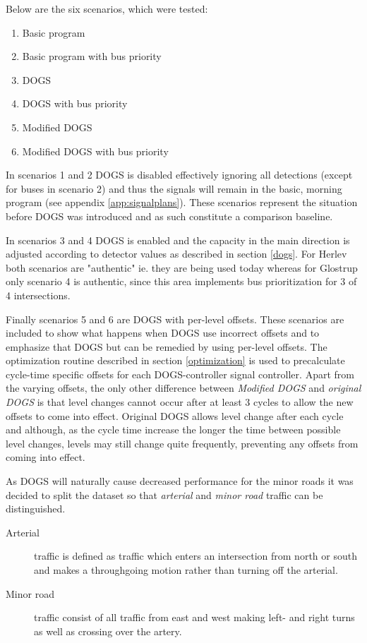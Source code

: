 Below are the six scenarios, which were tested:

\begin{enumerate}
\item Basic program
\item Basic program with bus priority
\item DOGS
\item DOGS with bus priority
\item Modified DOGS
\item Modified DOGS with bus priority
\end{enumerate}

In scenarios 1 and 2 DOGS is disabled effectively ignoring all detections (except for buses in scenario 2) and thus the signals will remain in the basic, morning program (see appendix \ref{app:signalplans}). These scenarios represent the situation before DOGS was introduced and as such constitute a comparison baseline.

In scenarios 3 and 4 DOGS is enabled and the capacity in the main direction is adjusted according to detector values as described in section \ref{dogs}. For Herlev both scenarios are "authentic" ie. they are being used today whereas for Glostrup only scenario 4 is authentic, since this area implements bus prioritization for 3 of 4 intersections.

Finally scenarios 5 and 6 are DOGS with per-level offsets. These scenarios are included to show what happens when DOGS use incorrect offsets and to emphasize that DOGS but can be remedied by using per-level offsets. 
The optimization routine described in section \ref{optimization} is used to precalculate cycle-time specific offsets for each DOGS-controller signal controller. 
Apart from the varying offsets, the only other difference between \textit{Modified DOGS} and \textit{original DOGS} is that level changes cannot occur after at least 3 cycles to allow the new offsets to come into effect. Original DOGS allows level change after each cycle and although, as the cycle time increase the longer the time between possible level changes, levels may still change quite frequently, preventing any offsets from coming into effect.

As DOGS will naturally cause decreased performance for the minor roads it was decided to split the dataset so that \textit{arterial} and \textit{minor road} traffic can be distinguished. 

\begin{description}
\item[Arterial] traffic is defined as traffic which enters an intersection from north or south and makes a throughgoing motion rather than turning off the arterial. 
\item[Minor road] traffic consist of all traffic from east and west making left- and right turns as well as crossing over the artery.
\end{description}

